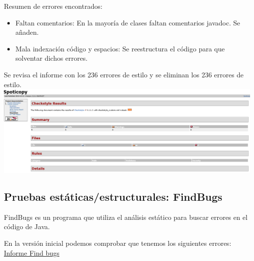 \documentclass[12pt, a4paper, titlepage]{article}
\begin{document}
	Resumen de errores encontrados:
	\begin{itemize}
		\item Faltan comentarios: En la mayoría de clases faltan comentarios javadoc. Se añaden.
		\item Mala indexación código y espacios: Se reestructura el código para que solventar dichos errores.
		\end{itemize}
		
		Se revisa el informe con los 236 errores de estilo y se eliminan los 236 errores de estilo.
		\includegraphics[width=15cm]{Imagenes/CheckStyleResut.png} \\
	\subsection{Pruebas estáticas/estructurales: FindBugs}
	
	FindBugs es un programa que utiliza el análisis estático para buscar errores en el código de Java.
	
	En la versión inicial podemos comprobar que tenemos los siguientes errores:
	\href{Informes/SiteTestInicial/findbugs.html}{Informe Find bugs} \\
\end{document}
